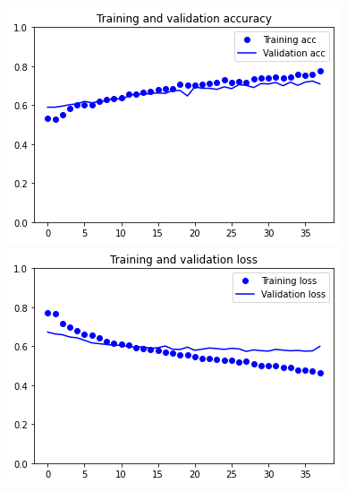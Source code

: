 \documentclass{article}
\begin{document}
\begin{figure}[h]
    \centering
    \begin{minipage}{0.45\textwidth}
        \centering
        \includegraphics[scale=0.4]{./img/siamese_concat_accuracy.png}
    \end{minipage}\hfill
    \begin{minipage}{0.45\textwidth}
        \centering
        \includegraphics[scale=0.4]{./img/siamese_concat_loss.png}
    \end{minipage}
\end{figure}
\end{document}
